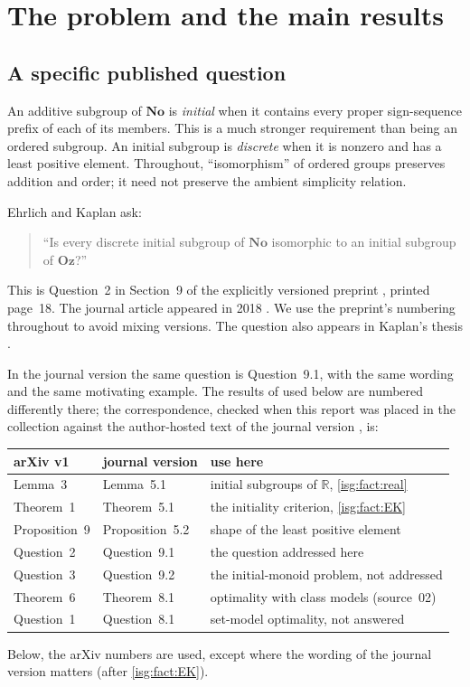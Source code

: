 \documentclass[11pt]{article}
\theoremstyle{definition}
\theoremstyle{remark}
\newcommand{\No}{\ensuremath{\mathbf{No}}}
\newcommand{\Oz}{\ensuremath{\mathbf{Oz}}}
\newcommand{\R}{\mathbb{R}}
\begin{document}
\begingroup
\small
\setlength{\parskip}{0pt}
\tableofcontents
\endgroup
\newpage

\section{The problem and the main results}\label{isg:sec:intro}

\subsection{A specific published question}
An additive subgroup of $\No$ is \emph{initial} when it contains every
proper sign-sequence prefix of each of its members. This is a much stronger
requirement than being an ordered subgroup. An initial subgroup is
\emph{discrete} when it is nonzero and has a least positive element.
Throughout, ``isomorphism'' of ordered groups preserves addition and
order; it need not preserve the ambient simplicity relation.

Ehrlich and Kaplan ask:
\begin{quote}
``Is every discrete initial subgroup of $\No$ isomorphic to an initial
subgroup of $\Oz$?''
\end{quote}
This is Question~2 in Section~9 of the explicitly versioned preprint
\cite{EK}, printed page~18. The journal article appeared in 2018
\cite{EKjournal}. We use the preprint's numbering throughout to avoid
mixing versions. The question also appears in Kaplan's thesis
\cite{Kaplan}.

In the journal version the same question is Question~9.1, with the same
wording and the same motivating example. The results of \cite{EK} used
below are numbered differently there; the correspondence, checked when
this report was placed in the collection against the author-hosted text
of the journal version \cite{EKjournal}, is:
\begin{center}\small
\begin{tabular}{@{}lll@{}}
\toprule
arXiv v1 \cite{EK} & journal version \cite{EKjournal} & use here\\
\midrule
Lemma~3 & Lemma~5.1 & initial subgroups of $\R$, \cref{isg:fact:real}\\
Theorem~1 & Theorem~5.1 & the initiality criterion, \cref{isg:fact:EK}\\
Proposition~9 & Proposition~5.2 & shape of the least positive element\\
Question~2 & Question~9.1 & the question addressed here\\
Question~3 & Question~9.2 & the initial-monoid problem, not addressed\\
Theorem~6 & Theorem~8.1 & optimality with class models (source~02)\\
Question~1 & Question~8.1 & set-model optimality, not answered\\
\bottomrule
\end{tabular}
\end{center}
Below, the arXiv numbers are used, except where the wording of the
journal version matters (after \cref{isg:fact:EK}).
\end{document}
